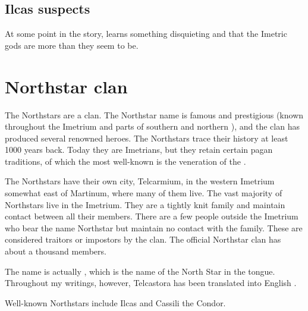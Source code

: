 \subsection{Ilcas suspects}
At some point in the story,  learns something disquieting and  that the Imetric gods are more than they seem to be. 









\section{Northstar clan}
The Northstars are a \scathaese{} clan. 
The Northstar name is famous and prestigious (known throughout the Imetrium and parts of southern \Velcad{} and northern \Durcac), and the clan has produced several renowned heroes. 
The Northstars trace their history at least 1000 years back. 
Today they are Imetrians, but they retain certain pagan traditions, of which the most well-known is the veneration of the . 

The Northstars have their own city, Telcarmium, in the western Imetrium somewhat east of Martinum, where many of them live. The vast majority of Northstars live in the Imetrium. 
They are a tightly knit family and maintain contact between all their members. 
There are a few people outside the Imetrium who bear the name Northstar but maintain no contact with the family. 
These are considered traitors or impostors by the clan. 
The official Northstar clan has about a thousand members. 

The name  is actually , which is the name of the North Star in the \Ortaican{} tongue. 
Throughout my writings, however, Telcastora has been translated into English . 

Well-known Northstars include Ilcas and Cassili the Condor. 
























